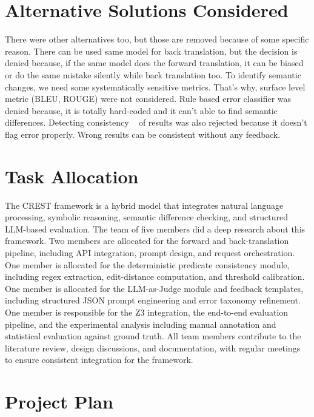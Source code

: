 \section{Alternative Solutions Considered}

There were other alternatives too, but those are removed because of some specific reason.
There can be used same model for back translation, but the decision is denied because, if the same model does the forward translation, it can be biased or do the same mistake silently while back translation too.
To identify semantic changes, we need some systematically sensitive metrics. That's why, surface level metric (BLEU, ROUGE) were not considered. 
Rule based error classifier was denied because, it is totally hard-coded and it can't able to find semantic differences.
Detecting consistency ~\cite{manakul2023selfcheck}  of results was also rejected because it doesn't flag error properly. Wrong results can be consistent without any feedback.

\section{Task Allocation}

The CREST framework is a hybrid model that integrates natural language processing, symbolic reasoning, semantic difference checking, and structured LLM-based evaluation. The team of five members did a deep research about this framework. Two members are allocated for the forward and back-translation pipeline, including API integration, prompt design, and request orchestration. One member is allocated for the deterministic predicate consistency module, including regex extraction, edit-distance computation, and threshold calibration. One member is allocated for the LLM-as-Judge module and feedback templates, including structured JSON prompt engineering and error taxonomy refinement. One member is responsible for the Z3 integration, the end-to-end evaluation pipeline, and the experimental analysis including manual annotation and statistical evaluation against ground truth. All team members contribute to the literature review, design discussions, and documentation, with regular  meetings to ensure consistent integration for the framework.

\section{Project Plan}

